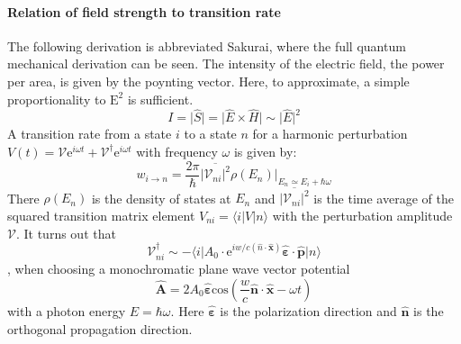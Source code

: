 \documentclass[twoside,openright,listof=numbered]{scrreprt}
\begin{document}
\paragraph{Relation of field strength to transition rate} The following derivation is abbreviated Sakurai\cite[chapter 5.7-5.8]{Sakurai_Napolitano_2017}, where the full quantum mechanical derivation can be seen.
The intensity of the electric field, the power per area, is given by the poynting vector. Here, to approximate, a simple proportionality to  $\mathrm{E^2}$ is sufficient.
\begin{equation*}
I =  \lvert  \hat{S} \rvert =  \lvert \hat{E} \times \hat{H} \rvert  \sim \lvert \hat{E} \rvert^2
\end{equation*}
A transition rate from a state $i$ to a state $n$ for a harmonic  perturbation $V(t) = \mathcal{V}\mathrm{e}^{i\omega t} + \mathcal{V}^\dagger \mathrm{e}^{i\omega t}$ with frequency $\omega$ is given by:\cite[chapter 5.7]{Sakurai_Napolitano_2017}
\begin{equation}\label{eq:transitionRate}
w_{i\rightarrow n} = \frac{2\pi}{\hbar}\overline{\lvert \mathcal{V}_{ni}\rvert^2}\rho(E_n)\vert_{E_n \simeq E_i + \hbar\omega}
\end{equation}
There $\rho(E_n)$ is the density of states at $E_n$ and $\overline{\lvert \mathcal{V}_{ni}\rvert^2}$ is the time average of the squared transition matrix element $V_{ni} = \langle i\lvert V\rvert n \rangle$ with the perturbation amplitude $\mathcal{V}$. %
It turns out that 
\begin{equation}\mathcal{V}^\dagger_{ni} \sim -\langle i\lvert A_0\cdot \mathrm{e}^{iw/c\left(\hat{n}\cdot\mathbf{\hat{x}}\right)} \mathbf{\hat{\varepsilon}}\cdot\mathbf{\hat{p}}\rvert n \rangle
\end{equation}
, when choosing a monochromatic plane wave vector potential
\begin{equation*}\mathbf{\hat{A}} = 2A_0\mathbf{\hat{\varepsilon}}\mathrm{cos}\left(\frac{w}{c}\mathbf{\hat{n}\cdot \hat{x}}-\omega t\right)
\end{equation*} with a photon energy  $E =\hbar\omega$. Here $\mathbf{\hat{\varepsilon}}$ is the polarization direction and $\mathbf{\hat{n}}$ is the orthogonal propagation direction.\cite[chapter 5.7-5.8]{Sakurai_Napolitano_2017}
\end{document}
